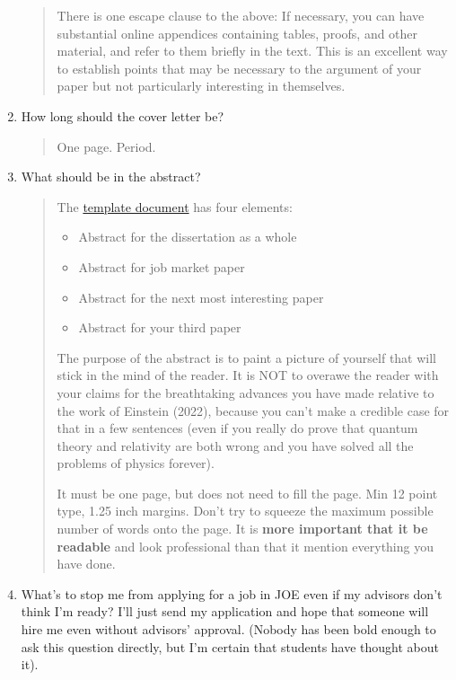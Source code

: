 \documentclass{\classes/econtex}
\begin{document}
\begin{enumerate}
\begin{quote}
    There is one escape clause to the above: If necessary, you can have
    substantial online appendices containing tables, proofs, and other material, and
    refer to them briefly in the text.  This is an excellent way to
    establish points that may be necessary to the argument of your paper
    but not particularly interesting in themselves.   

  \end{quote}

\item  How long should the cover letter be?
  \begin{quote}
    One page.  Period.

  \end{quote}

\item  What should be in the abstract?
  \begin{quote}
    The \href{https://github.com/llorracc/JobMarket-Templates/blob/main/moniker-dir-make/Abstract.tex}{template document} has four elements:
    \begin{itemize}
    \item Abstract for the dissertation as a whole
    \item Abstract for job market paper
    \item Abstract for the next most interesting paper
    \item Abstract for your third paper
    \end{itemize}

    The purpose of the abstract is to paint a picture of yourself that will stick in the mind of the reader.  It is NOT to overawe the reader with your claims for the breathtaking advances you have made relative to the work of Einstein (2022), because you can't make a credible case for that in a few sentences (even if you really do prove that quantum theory and relativity are both wrong and you have solved all the problems of physics forever).

    It must be one page, but does not need to fill the page.  Min 12 point type, 1.25 inch margins.  Don't try to squeeze the maximum possible number of words onto the page.  It is \textbf{more important that it be readable} and look professional than that it mention everything you have done.

  \end{quote}

\item  What's to stop me from applying for a job in JOE even if my advisors don't think I'm ready?  I'll just send my application and hope that someone will hire me even without advisors' approval.  (Nobody has been bold enough to ask this question directly, but I'm certain that students have thought about it).


\end{enumerate}
\end{document}
